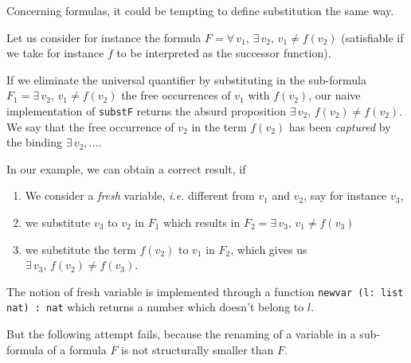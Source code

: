 

Concerning formulas, it could be tempting to define substitution the same way.

Let us consider for instance the formula $F = \forall\,v_1, \,\exists\,v_2,\,v_1\not=f(v_2)$ (satisfiable if we take for instance $f$ to be interpreted as the successor function).

If we eliminate the universal quantifier by substituting in
the sub-formula $F_1=  \exists\,v_2,\,v_1\not=f(v_2)$ the free
occurrences of $v_1$ with $f(v_2)$, our naive implementation of
\texttt{substF} returns the absurd proposition $\exists\,v_2,\,f(v_2)\not=f(v_2)$. We  say that the free occurrence of $v_2$ in the term $f(v_2)$ has been \emph{captured} by the binding $\exists\,v_2,\dots$.


In our example, we can obtain a correct result, if
\begin{enumerate}
\item We consider a \emph{fresh} variable, \emph{i.e.}  different from $v_1$ and $v_2$, say for instance $v_3$,
\item we substitute $v_3$ to $v_2$ in $F_1$ which results in
   $F_2= \exists\,v_3,\,v_1\not=f(v_3)$
\item we substitute the term $f(v_2)$ to $v_1$ in $F_2$, which gives us 
  $\exists\,v_3,\,f(v_2)\not=f(v_3)$.
\end{enumerate}

The notion of fresh variable is implemented through a function
\texttt{newvar (l: list nat) : nat} which returns a number which doesn't belong to $l$.

But the following attempt fails, because the renaming of a  variable in a 
sub-formula of a formula $F$ is not structurally smaller than $F$.







